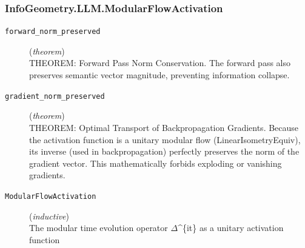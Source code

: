 \documentclass[11pt,a4paper]{article}
\begin{document}
\subsubsection*{InfoGeometry.LLM.ModularFlowActivation}
\begin{description}
  \item[\texttt{forward\_norm\_preserved}] (\textit{theorem}) \\ THEOREM: Forward Pass Norm Conservation. 
The forward pass also preserves semantic vector magnitude,  
preventing information collapse.
  \item[\texttt{gradient\_norm\_preserved}] (\textit{theorem}) \\ THEOREM: Optimal Transport of Backpropagation Gradients. 
Because the activation function is a unitary modular flow (LinearIsometryEquiv),  
its inverse (used in backpropagation) perfectly preserves the norm of the gradient vector. 
This mathematically forbids exploding or vanishing gradients.
  \item[\texttt{ModularFlowActivation}] (\textit{inductive}) \\ The modular time evolution operator $\Delta $\textasciicircum{}\{it\} as a unitary activation function
\end{description}
\end{document}
